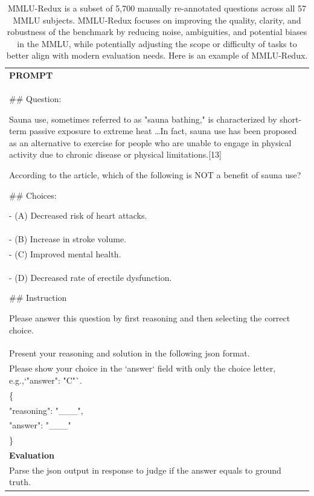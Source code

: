 \begin{table}[h]
    \centering \small
        \caption{MMLU-Redux is a subset of 5,700 manually re-annotated questions across all 57 MMLU subjects. MMLU-Redux focuses on improving the quality, clarity, and robustness of the benchmark by reducing noise, ambiguities, and potential biases in the MMLU, while potentially adjusting the scope or difficulty of tasks to better align with modern evaluation needs. Here is an example of MMLU-Redux.}
    \label{tab:mmluredux_eval_format_example}
    \begin{tabular}{p{}}
    \hline
    \textbf{PROMPT}\\
    \#\# Question: 

Sauna use, sometimes referred to as "sauna bathing," is characterized by short-term passive exposure to extreme heat \ldots In fact, sauna use has been proposed as an alternative to exercise for people who are unable to engage in physical activity due to chronic disease or physical limitations.[13]

According to the article, which of the following is NOT a benefit of sauna use?

\#\# Choices:

- (A) Decreased risk of heart attacks. \\
- (B) Increase in stroke volume. \\
- (C) Improved mental health. \\
- (D) Decreased rate of erectile dysfunction.


\#\# Instruction 

Please answer this question by first reasoning and then selecting the correct choice. \\
Present your reasoning and solution in the following json format. \\
Please show your choice in the `answer` field with only the choice letter, e.g.,`"answer": "C"`. \\

\{ \\
    "reasoning": "\_\_\_", \\
    "answer": "\_\_\_" \\
\}\\ \hline
      \textbf{Evaluation}\\
      Parse the json output in response to judge if the answer equals to ground truth. \\ \hline
    \end{tabular}
\end{table}


